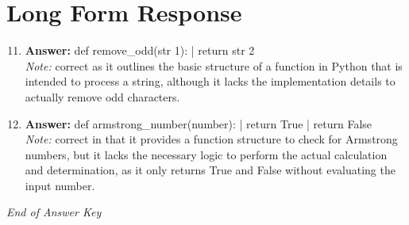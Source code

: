 \documentclass[12pt]{article}
\begin{document}
\section*{Long Form Response}
\begin{enumerate}[label=\arabic*.]
\setcounter{enumi}{10}
\item \textbf{Answer:} def remove\_odd(str 1): | return str 2
\\ \textit{Note:} correct as it outlines the basic structure of a function in Python that is intended to process a string, although it lacks the implementation details to actually remove odd characters.
\item \textbf{Answer:} def armstrong\_number(number): | return True | return False
\\ \textit{Note:} correct in that it provides a function structure to check for Armstrong numbers, but it lacks the necessary logic to perform the actual calculation and determination, as it only returns True and False without evaluating the input number.
\end{enumerate}

\vfill
\noindent\textit{End of Answer Key}
\end{document}
